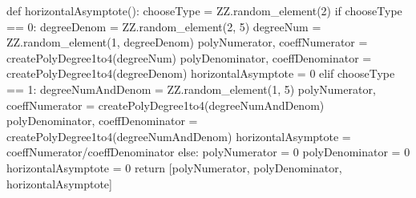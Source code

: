 \documentclass{ximera}
\begin{document}
\begin{sagesilent}
def horizontalAsymptote():
    chooseType = ZZ.random_element(2)
    if chooseType == 0:
        degreeDenom = ZZ.random_element(2, 5)
        degreeNum = ZZ.random_element(1, degreeDenom)
        polyNumerator, coeffNumerator = createPolyDegree1to4(degreeNum)
        polyDenominator, coeffDenominator = createPolyDegree1to4(degreeDenom)
        horizontalAsymptote = 0
    elif chooseType == 1:
        degreeNumAndDenom = ZZ.random_element(1, 5)
        polyNumerator, coeffNumerator = createPolyDegree1to4(degreeNumAndDenom)
        polyDenominator, coeffDenominator = createPolyDegree1to4(degreeNumAndDenom)
        horizontalAsymptote = coeffNumerator/coeffDenominator
    else:
        polyNumerator = 0
        polyDenominator = 0
        horizontalAsymptote = 0
    return [polyNumerator, polyDenominator, horizontalAsymptote]
     

\end{sagesilent}
\end{document}
